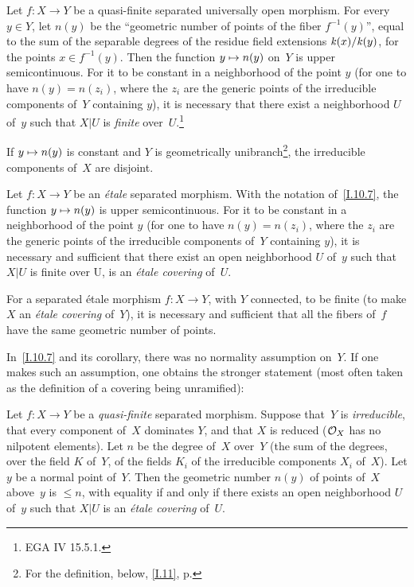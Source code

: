 \begin{proposition}
\label{I.10.7}
Let $f\colon X\to Y$ be a quasi-finite separated
universally open morphism. For every $y\in Y$, let
$n(y)$ be the ``geometric number of points of the
fiber $f^{-1}(y)$'', equal to the sum of the separable
degrees of the residue field extensions
$\kres(x)/\kres(y)$, for the points $x\in f^{-1}(y)$.
Then the function $y\mto n(y)$ on~$Y$ is upper
semicontinuous. For it to be constant in a neighborhood
of the point $y$ (\ie for one to have $n(y)=n(z_i)$,
where the $z_i$ are the generic points of the
irreducible components of~$Y$ containing $y$), it is
necessary that there exist a neighborhood $U$ of~$y$
such that $X|U$ is \emph{finite} over~$U$.\footnote{\Cf
EGA IV 15.5.1.}
\end{proposition}

\begin{corollary}
\label{I.10.8}
If $y\mto n(y)$ is constant and $Y$ is geometrically
unibranch\footnote{For the definition, \cf below,
\No\ref{I.11}, p\ptbl\pageref{I.11}.}, the irreducible
components of~$X$ are disjoint.
\end{corollary}

\begin{proposition}
\label{I.10.9}
Let $f\colon X\to Y$ be an \emph{\'etale} separated
morphism. With the notation of~\ref{I.10.7}, the
function $y\mto n(y)$ is upper semicontinuous. For
it to be constant in a neighborhood of the point $y$
(\ie for one to have $n(y)=n(z_i)$, where the $z_i$
are the generic points of the irreducible components
of~$Y$ containing $y$), it is necessary and sufficient
that there exist an open neighborhood $U$ of~$y$
such that $X|U$ is finite over U, \ie is an
\emph{\'etale covering} of~$U$.
\end{proposition}

\begin{corollary}
\label{I.10.10}
For a separated \'etale morphism $f\colon X\to Y$,
with $Y$ connected, to be finite (\ie to make $X$
an \emph{\'etale covering} of~$Y$), it is necessary
and sufficient that all the fibers of~$f$ have the
same geometric number of points.
\end{corollary}

In~\ref{I.10.7} and its corollary, there was no
normality assumption on~$Y$. If one makes such an
assumption, one obtains the stronger statement
(most often taken as the definition of a covering
being unramified):

\begin{theorem}
\label{I.10.11}
Let
$f\colon X\to Y$ be a \emph{quasi-finite} separated
morphism. Suppose that~$Y$ is \emph{irreducible},
that every component of~$X$ dominates $Y$, and that
$X$ is reduced (\ie $\cal{O}_X$ has no nilpotent
elements). Let $n$ be the degree of~$X$ over~$Y$
(the sum of the degrees, over the field $K$ of~$Y$,
of the fields $K_i$ of the irreducible components
$X_i$ of~$X$). Let $y$ be a normal point of~$Y$.
Then the geometric number $n(y)$ of points of~$X$
above~$y$ is $\le n$, with equality if and only if
there exists an open neighborhood $U$ of~$y$ such
that $X|U$ is an \emph{\'etale covering} of~$U$.
\end{theorem}

